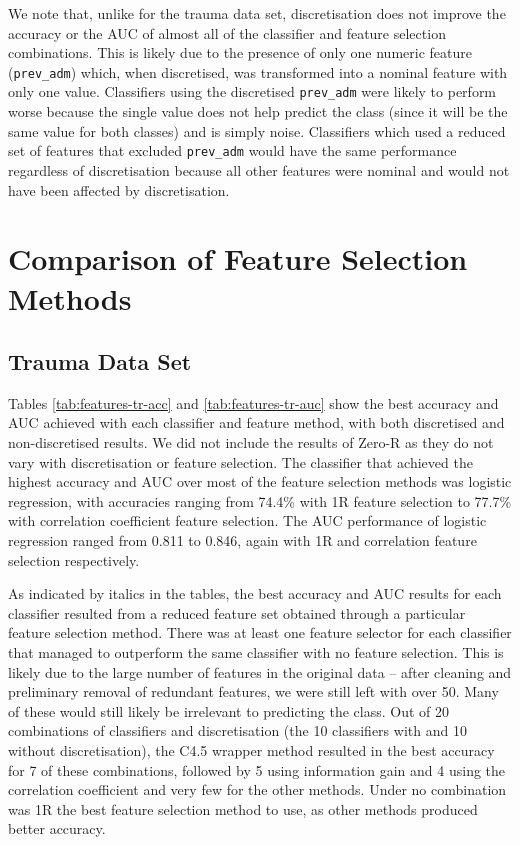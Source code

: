 We note that, unlike for the trauma data set, discretisation does not improve
the accuracy or the AUC of almost all of the classifier and feature selection
combinations. This is likely due to the presence of only one numeric feature
(\texttt{prev\_adm}) which, when discretised, was transformed into a nominal
feature with only one value. Classifiers using the discretised
\texttt{prev\_adm} were likely to perform worse because the single value does
not help predict the class (since it will be the same value for both classes)
and is simply noise. Classifiers which used a reduced set of features that
excluded \texttt{prev\_adm} would have the same performance regardless of
discretisation because all other features were nominal and would not have been
affected by discretisation.

\section{Comparison of Feature Selection Methods}
\subsection{Trauma Data Set}
Tables \ref{tab:features-tr-acc} and \ref{tab:features-tr-auc} show the
best accuracy and AUC achieved with each classifier and feature method, with
both discretised and non-discretised results. We did not include the results of
Zero-R as they do not vary with discretisation or feature selection.
The classifier that achieved the
highest accuracy and AUC over most of the feature selection methods was
logistic regression, with accuracies ranging from 74.4\% with 1R feature
selection to 77.7\% with correlation coefficient feature selection. The AUC
performance of logistic regression ranged from 0.811 to 0.846, again with
1R and correlation feature selection respectively.



As indicated by italics in the tables, the best accuracy and AUC results for
each classifier resulted from a reduced feature set obtained through a
particular feature selection method. There was at least one feature selector
for each classifier that managed to outperform the same classifier with
no feature selection. This is likely due to the large number of features in
the original data -- after cleaning and preliminary removal of redundant
features, we were still left with over 50. Many of these would still likely
be irrelevant to predicting the class.
Out of 20 combinations of classifiers
and discretisation (the 10 classifiers with and 10 without
discretisation), the C4.5 wrapper method resulted in the best
accuracy for 7 of these combinations, followed by 5 using information gain
and 4 using the correlation coefficient and very few for the other methods.
Under no combination was 1R the best feature selection method to use, as other
methods produced better accuracy.

